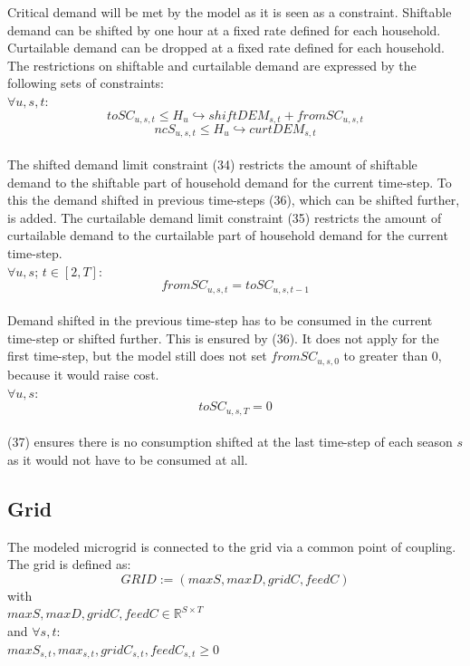 \documentclass[
	11pt,								%
	DIV10,								%
	a4paper,         					%
	oneside,							%
	headheight=20pt,					%
	footheight=20pt,					%
    parskip=full,						%
    listof=totoc,						%
	bibliography=totoc,					%
	index=totoc,						%
]{scrartcl}
\begin{document}
Critical demand will be met by the model as it is seen as a constraint. Shiftable demand can be shifted by one hour at a fixed rate defined for each household. Curtailable demand can be dropped at a fixed rate defined for each household.
The restrictions on shiftable and curtailable demand are expressed by the following sets of constraints:
\\
$\forall u,s,t$:
\begin{equation}
	toSC_{u,s,t} \leq H_u \hookrightarrow shiftDEM_{s,t} + fromSC_{u,s,t}
\end{equation}
\begin{equation}
	ncS_{u,s,t} \leq H_u \hookrightarrow curtDEM_{s,t}
\end{equation}
\\
The shifted demand limit constraint (34) restricts the amount of shiftable demand to the shiftable part of household demand for the current time-step. To this the demand shifted in previous time-steps (36), which can be shifted further, is added. The curtailable demand limit constraint (35) restricts the amount of curtailable demand to the curtailable part of household demand for the current time-step.
\\
$\forall u,s$; $t \in [2,T]$:
\begin{equation}
	fromSC_{u,s,t} = toSC_{u,s,t-1}
\end{equation}
\\
Demand shifted in the previous time-step has to be consumed in the current time-step or shifted further. This is ensured by (36). It does not apply for the first time-step, but the model still does not set $fromSC_{u,s,0}$ to greater than 0, because it would raise cost.
\\
$\forall u,s$:
\begin{equation}
	toSC_{u,s,T} = 0
\end{equation}
\\
(37) ensures there is no consumption shifted at the last time-step of each season $s$ as it would not have to be consumed at all.


\subsection{Grid}
The modeled microgrid is connected to the grid via a common point of coupling. The grid is defined as:
\begin{equation}
	GRID:= (maxS, maxD, gridC, feedC)
\end{equation}
with\\
$maxS,maxD, gridC, feedC \in \mathbb{R}^{S \times T}$\\
and $\forall s,t$: \\
$maxS_{s,t}, max_{s,t}, gridC_{s,t}, feedC_{s,t} \geq 0$
\end{document}
